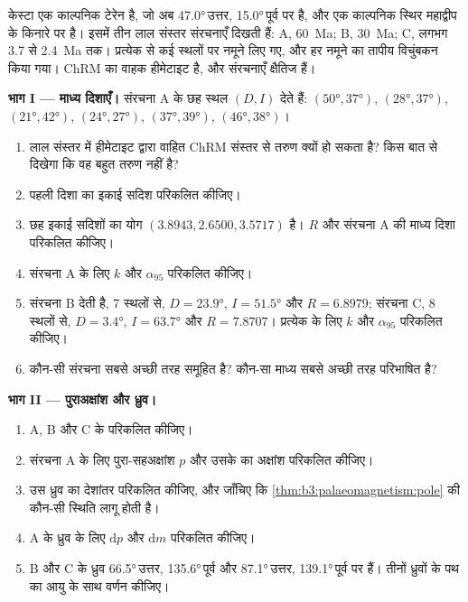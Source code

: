 \begin{problem}
\label{pb:b3:palaeomagnetism:1}
केस्टा एक काल्पनिक टेरेन है, जो अब \ang{47.0}\,उत्तर, \ang{15.0}\,पूर्व पर है, और एक काल्पनिक स्थिर महाद्वीप के
किनारे पर है। इसमें तीन लाल संस्तर संरचनाएँ दिखती हैं: A,
\qty{60}{Ma}; B, \qty{30}{Ma}; C, लगभग 3.7 से \qty{2.4}{Ma} तक। प्रत्येक से
कई स्थलों पर नमूने लिए गए, और हर नमूने का तापीय विचुंबकन किया गया। ChRM
का वाहक हीमेटाइट है, और संरचनाएँ क्षैतिज हैं।

\medskip\noindent\textbf{भाग I --- माध्य दिशाएँ।} संरचना A के छह स्थल
$(D, I)$ देते हैं: $(\ang{50}, \ang{37})$, $(\ang{28}, \ang{37})$,
$(\ang{21}, \ang{42})$, $(\ang{24}, \ang{27})$, $(\ang{37}, \ang{39})$,
$(\ang{46}, \ang{38})$।
\begin{enumerate}
  \item लाल संस्तर में हीमेटाइट द्वारा वाहित ChRM संस्तर से तरुण क्यों हो सकता है?
        किस बात से दिखेगा कि वह बहुत तरुण नहीं है?
  \item पहली दिशा का इकाई सदिश परिकलित कीजिए।
  \item छह इकाई सदिशों का योग $(3.8943, 2.6500, 3.5717)$ है। $R$ और
        संरचना A की माध्य दिशा परिकलित कीजिए।
  \item संरचना A के लिए $k$ और $\alpha_{95}$ परिकलित कीजिए।
  \item संरचना B देती है, 7 स्थलों से, $D = \ang{23.9}$, $I = \ang{51.5}$ और
        $R = 6.8979$; संरचना C, 8 स्थलों से, $D = \ang{3.4}$, $I =
        \ang{63.7}$ और $R = 7.8707$। प्रत्येक के लिए $k$ और $\alpha_{95}$ परिकलित कीजिए।
  \item कौन-सी संरचना सबसे अच्छी तरह समूहित है? कौन-सा माध्य सबसे अच्छी तरह परिभाषित है?
\end{enumerate}

\medskip\noindent\textbf{भाग II --- पुराअक्षांश और ध्रुव।}
\begin{enumerate}[resume]
  \item A, B और C के  परिकलित कीजिए।
  \item संरचना A के लिए पुरा-सहअक्षांश $p$ और उसके
         का अक्षांश परिकलित कीजिए।
  \item उस ध्रुव का देशांतर परिकलित कीजिए, और जाँचिए कि
        \cref{thm:b3:palaeomagnetism:pole} की कौन-सी स्थिति लागू होती है।
  \item A के ध्रुव के लिए $\mathrm dp$ और $\mathrm dm$ परिकलित कीजिए।
  \item B और C के ध्रुव \ang{66.5}\,उत्तर, \ang{135.6}\,पूर्व और
        \ang{87.1}\,उत्तर, \ang{139.1}\,पूर्व पर हैं। तीनों ध्रुवों के पथ का
        आयु के साथ वर्णन कीजिए।
\end{enumerate}


\end{problem}
